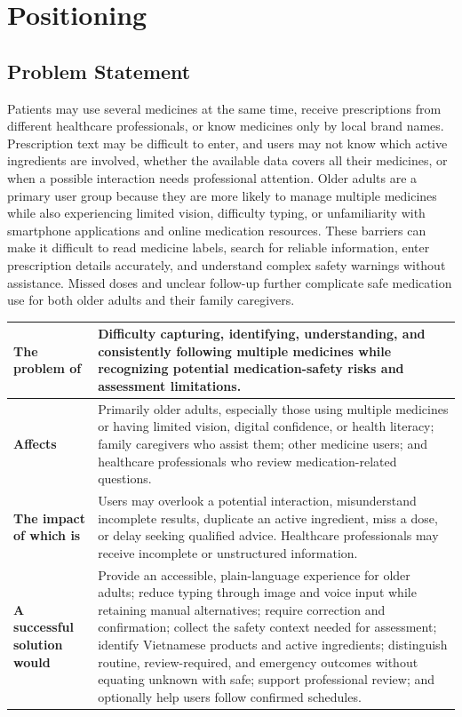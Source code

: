 \section{Positioning}

\subsection{Problem Statement}

Patients may use several medicines at the same time, receive prescriptions from
different healthcare professionals, or know medicines only by local brand
names. Prescription text may be difficult to enter, and users may not know
which active ingredients are involved, whether the available data covers all
their medicines, or when a possible interaction needs professional attention.
Older adults are a primary user group because they are more likely to manage
multiple medicines while also experiencing limited vision, difficulty typing,
or unfamiliarity with smartphone applications and online medication resources.
These barriers can make it difficult to read medicine labels, search for
reliable information, enter prescription details accurately, and understand
complex safety warnings without assistance. Missed doses and unclear follow-up
further complicate safe medication use for both older adults and their family
caregivers.

\begin{tabularx}{\textwidth}{|L{0.27\textwidth}|Y|}
\hline
\textbf{The problem of} & Difficulty capturing, identifying, understanding, and consistently following multiple medicines while recognizing potential medication-safety risks and assessment limitations.\\ \hline
\textbf{Affects} & Primarily older adults, especially those using multiple medicines or having limited vision, digital confidence, or health literacy; family caregivers who assist them; other medicine users; and healthcare professionals who review medication-related questions.\\ \hline
\textbf{The impact of which is} & Users may overlook a potential interaction, misunderstand incomplete results, duplicate an active ingredient, miss a dose, or delay seeking qualified advice. Healthcare professionals may receive incomplete or unstructured information.\\ \hline
\textbf{A successful solution would} & Provide an accessible, plain-language experience for older adults; reduce typing through image and voice input while retaining manual alternatives; require correction and confirmation; collect the safety context needed for assessment; identify Vietnamese products and active ingredients; distinguish routine, review-required, and emergency outcomes without equating unknown with safe; support professional review; and optionally help users follow confirmed schedules.\\ \hline
\end{tabularx}

